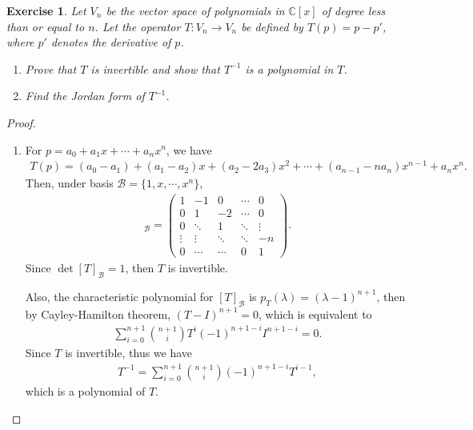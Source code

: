 \documentclass[11pt]{article}
\newtheorem{exercise}{Exercise}[section]
\theoremstyle{definition}
\numberwithin{equation}{subsection}
\begin{document}
\begin{exercise}\label{April_2017_4}
Let $V_n$ be the vector space of polynomials in $\mathbb{C}[x]$ of degree less than or equal to $n$. Let the operator $T: V_n \to V_n$ be defined by $T(p) = p - p'$, where $p'$ denotes the derivative of $p$.
\begin{enumerate}[label=(\alph*)]
    \item Prove that $T$ is invertible and show that $T^{-1}$ is a polynomial in $T$.
    
    \item{\rm *} Find the Jordan form of $T^{-1}$.
\end{enumerate}
\end{exercise}
\begin{proof}
~\begin{enumerate}[label=(\alph*)]
    \item For $p = a_0 + a_1x + \cdots + a_nx^n$, we have
    \begin{align*}
        T(p) = (a_0 - a_1) + (a_1 - a_2)x + (a_2 - 2a_3)x^2 + \cdots + (a_{n-1} - na_n)x^{n-1} + a_n x^n.
    \end{align*}
    Then, under basis $\mathcal{B} = \{1, x, \cdots, x^n\}$, 
    \begin{align*}
        [T]_{\mathcal{B}} = \begin{pmatrix}
            1 & -1 & 0 & \cdots & 0 \\
            0 & 1 & -2 & \cdots & 0 \\
            0 & \ddots & 1 & \ddots & \vdots \\
            \vdots & \vdots & \ddots & \ddots & -n \\
            0 & \cdots & \cdots & 0 & 1
        \end{pmatrix}.
    \end{align*}
    Since $\det [T]_{\mathcal{B}} = 1$, then $T$ is invertible. 
    
    Also, the characteristic polynomial for $[T]_{\mathcal{B}}$ is $p_T(\lambda) = (\lambda - 1)^{n+1}$, then by Cayley-Hamilton theorem, $(T - I)^{n+1} = 0$, which is equivalent to 
    \begin{align*}
       \sum^{n+1}_{i=0}\binom{n+1}{i} T^{i} (-1)^{n+1-i} I^{n+1-i} = 0.
    \end{align*}
    Since $T$ is invertible, thus we have
    \begin{align*}
        T^{-1} = \sum^{n+1}_{i=0}\binom{n+1}{i} (-1)^{n+1-i} T^{i-1},
    \end{align*}
    which is a polynomial of $T$.
    

\end{enumerate}
\end{proof}
\end{document}
